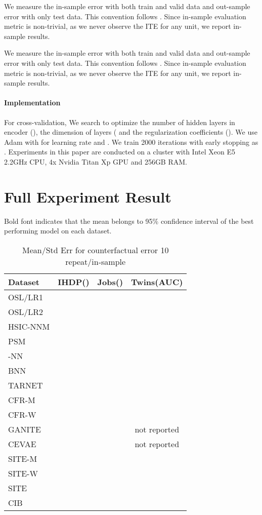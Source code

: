 \documentclass{article}
\begin{document}
    We measure the in-sample error with both train and valid data and out-sample error with only test data. This convention follows \cite{johansson16, Shalit17, yao2018}. Since in-sample evaluation metric is non-trivial, as we never observe the ITE for any unit, we report in-sample results.
    
    We measure the in-sample error with both train and valid data and out-sample error with only test data. This convention follows \cite{johansson16, Shalit17, yao2018}. Since in-sample evaluation metric is non-trivial, as we never observe the ITE for any unit, we report in-sample results.
    
    \paragraph{Implementation} For cross-validation, We search to optimize the number of hidden layers in encoder (), the dimension of layers ( and the regularization coefficients (). We use Adam\cite{Kingma2015} with  for learning rate and . We train 2000 iterations with early stopping as \cite{Shalit17, yao2018}. Experiments in this paper are conducted on a cluster with Intel Xeon E5 2.2GHz CPU, 4x Nvidia Titan Xp GPU and 256GB RAM.
    
\section{Full Experiment Result}
Bold font indicates that the mean belongs to 95\% confidence interval of the best performing model on each dataset.
\begin{table}[ht]
  \caption{Mean/Std Err for counterfactual error 10 repeat/in-sample}
  \label{metric-in_full}
  \centering
  \begin{tabular}{lccc}
    \toprule
    Dataset & IHDP() & Jobs() & Twins(AUC) \\
    \midrule
    OSL/LR1 &  &  &  \\
    OSL/LR2 &  &  &  \\
    \midrule
    HSIC-NNM &  &  &  \\
    PSM &  &  &  \\
    -NN &  &  &  \\
    \midrule
    BNN &  &  &  \\
    TARNET &  &  &  \\
    CFR-M &  &  &  \\
    CFR-W &  &  &  \\
    GANITE &  &  & not reported\\
    CEVAE &  &  & not reported\\
    SITE-M &  &  &  \\
    SITE-W &  &  &  \\
    SITE &  &  & \\
    \midrule
    CIB &  &  &  \\
    \bottomrule
  \end{tabular}
\end{table}
\end{document}
